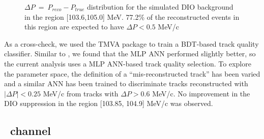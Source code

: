 \begin{figure}
  \caption{
    \label{fig:dio_delta_p_1036_1050} 
    $\Delta P ~=~ P_{reco} -P_{true}$ distribution for the simulated DIO background in the region [103.6,105.0] MeV.
    77.2\% of the reconstructed events in this region are expected to have $\Delta P < 0.5$ MeV/c
  }
\end{figure}

As a cross-check, we used the TMVA package to train a BDT-based track quality classifier.
Similar to \cite{MU2E_33150_ANN_TRAINING}, we found that the MLP ANN performed slightly better,
so the current analysis uses a MLP ANN-based track quality selection. 
To explore the parameter space, the definition of a ``mis-reconstructed track'' has been varied
and a similar ANN has been trained to discriminate tracks reconstructed with $|\Delta{P}| < 0.25$ MeV/c 
from tracks with $\Delta{P} > 0.6$ MeV/c.
No improvement in the DIO suppression in the region [103.85, 104.9] MeV/c was observed. 

\newpage
\subsection{\MuToEp\ channel}
\label{sec:mumep_channel}


